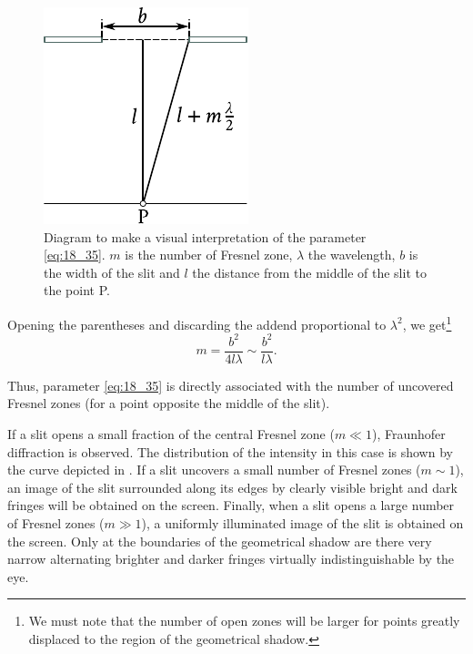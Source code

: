 \begin{figure}[!htb]
	\begin{center}
		\includegraphics[scale=0.95]{figures/ch_18/fig_18_31.pdf}
        \caption[]{Diagram to make a visual interpretation of the parameter \eqref{eq:18_35}. $m$ is the number of Fresnel zone, $\lambda$ the wavelength, $b$ is the width of the slit and $l$ the distance from the middle of the slit to the point P.}
		\label{fig:18_31}
	\end{center}
	\vspace{-0.8cm}
\end{figure}

Opening the parentheses and discarding the addend proportional to $\lambda^2$, we get\footnote{We must note that the number of open zones will be larger for points greatly displaced to the region of the geometrical shadow.}
\vspace{-12pt}
\begin{equation}\label{eq:18_37}
	m = \frac{b^2}{4l\lambda} \sim \frac{b^2}{l\lambda}.
\end{equation}

\noindent
Thus, parameter \eqref{eq:18_35} is directly associated with the number of uncovered Fresnel zones (for a point opposite the middle of the slit).

If a slit opens a small fraction of the central Fresnel zone ($m\ll 1$), Fraunhofer diffraction is observed.
The distribution of the intensity in this case is shown by the curve depicted in .
If a slit uncovers a small number of Fresnel zones ($m\sim 1$), an image of the slit surrounded along its edges by clearly visible bright and dark fringes will be obtained on the screen.
Finally, when a slit opens a large number of Fresnel zones ($m\gg 1$), a uniformly illuminated
image of the slit is obtained on the screen.
Only at the boundaries of the geometrical shadow are there very narrow alternating brighter and darker fringes virtually indistinguishable by the eye.


